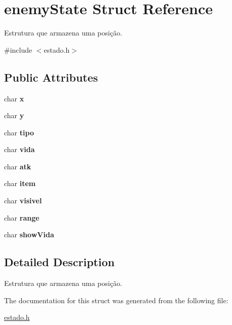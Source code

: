 \hypertarget{structenemyState}{}\section{enemy\+State Struct Reference}
\label{structenemyState}


Estrutura que armazena uma posição.  




{\ttfamily \#include $<$estado.\+h$>$}

\subsection*{Public Attributes}
\begin{DoxyCompactItemize}
\item 
char {\bfseries x}\hypertarget{structenemyState_ae6d5cfa384a78098cdf23ec69589b10d}{}\label{structenemyState_ae6d5cfa384a78098cdf23ec69589b10d}

\item 
char {\bfseries y}\hypertarget{structenemyState_a2173ca740a59463ead0c936a3241d761}{}\label{structenemyState_a2173ca740a59463ead0c936a3241d761}

\item 
char {\bfseries tipo}\hypertarget{structenemyState_ae500364f73acf0a77bd27079939370d5}{}\label{structenemyState_ae500364f73acf0a77bd27079939370d5}

\item 
char {\bfseries vida}\hypertarget{structenemyState_af5fe146ba8b66619c76393c93fa86b11}{}\label{structenemyState_af5fe146ba8b66619c76393c93fa86b11}

\item 
char {\bfseries atk}\hypertarget{structenemyState_a6a59304ef3b76ce826a9e587daf9b2ac}{}\label{structenemyState_a6a59304ef3b76ce826a9e587daf9b2ac}

\item 
char {\bfseries item}\hypertarget{structenemyState_a493e9483fc3aa2c07a83985442e77fce}{}\label{structenemyState_a493e9483fc3aa2c07a83985442e77fce}

\item 
char {\bfseries visivel}\hypertarget{structenemyState_a41fbd878c434babf902b1cb0378fac0e}{}\label{structenemyState_a41fbd878c434babf902b1cb0378fac0e}

\item 
char {\bfseries range}\hypertarget{structenemyState_a6ca2db93b244d4ffa467cdb5137cd107}{}\label{structenemyState_a6ca2db93b244d4ffa467cdb5137cd107}

\item 
char {\bfseries show\+Vida}\hypertarget{structenemyState_ac0c2c24945f8bb8edf25e040e2207acb}{}\label{structenemyState_ac0c2c24945f8bb8edf25e040e2207acb}

\end{DoxyCompactItemize}


\subsection{Detailed Description}
Estrutura que armazena uma posição. 

The documentation for this struct was generated from the following file\+:\begin{DoxyCompactItemize}
\item 
\hyperlink{estado_8h}{estado.\+h}\end{DoxyCompactItemize}
